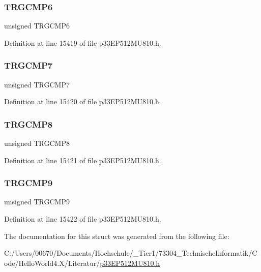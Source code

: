 \subsubsection{\texorpdfstring{T\+R\+G\+C\+M\+P6}{TRGCMP6}}
{\footnotesize\ttfamily unsigned T\+R\+G\+C\+M\+P6}



Definition at line 15419 of file p33\+E\+P512\+M\+U810.\+h.

\mbox{\label{structtag_t_r_i_g6_b_i_t_s_aa801131b5ab0b542a360d202275ea4fd}} 
\subsubsection{\texorpdfstring{T\+R\+G\+C\+M\+P7}{TRGCMP7}}
{\footnotesize\ttfamily unsigned T\+R\+G\+C\+M\+P7}



Definition at line 15420 of file p33\+E\+P512\+M\+U810.\+h.

\mbox{\label{structtag_t_r_i_g6_b_i_t_s_a7d4f3ec40334f00592eb7247457e2fd6}} 
\subsubsection{\texorpdfstring{T\+R\+G\+C\+M\+P8}{TRGCMP8}}
{\footnotesize\ttfamily unsigned T\+R\+G\+C\+M\+P8}



Definition at line 15421 of file p33\+E\+P512\+M\+U810.\+h.

\mbox{\label{structtag_t_r_i_g6_b_i_t_s_a0001e7efb9031bef24e7a19100d11b0b}} 
\subsubsection{\texorpdfstring{T\+R\+G\+C\+M\+P9}{TRGCMP9}}
{\footnotesize\ttfamily unsigned T\+R\+G\+C\+M\+P9}



Definition at line 15422 of file p33\+E\+P512\+M\+U810.\+h.



The documentation for this struct was generated from the following file\+:\begin{DoxyCompactItemize}
\item 
C\+:/\+Users/00670/\+Documents/\+Hochschule/\+\_\+\+Tier1/73304\+\_\+\+Technische\+Informatik/\+Code/\+Hello\+World4.\+X/\+Literatur/\hyperlink{p33_e_p512_m_u810_8h}{p33\+E\+P512\+M\+U810.\+h}\end{DoxyCompactItemize}
